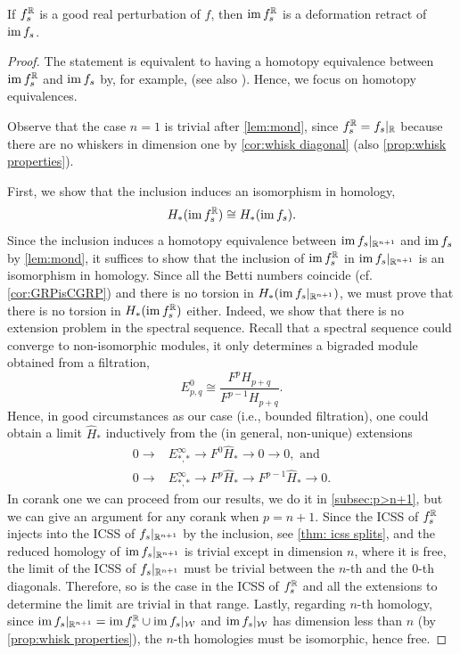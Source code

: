 \documentclass[a4paper,12pt]{amsart}
\begin{document}
\begin{theorem}\label{thm:htequin+1}
If $f_s^{\mathbb{R}}$ is a good real perturbation of $f$, then $\operatorname{im} f_s^{\mathbb{R}}$ is a deformation retract of $\operatorname{im} f_s$.
\end{theorem}
\begin{proof}
The statement is equivalent to having a homotopy equivalence between $\operatorname{im} f_s^{\mathbb{R}}$ and $\operatorname{im} f_s$ by, for example, \cite[Corollary 0.20]{Hatcher2002} (see also \cite[Proposition 0.16]{Hatcher2002}). Hence, we focus on homotopy equivalences.
\newline

Observe that the case $n=1$ is trivial after \cref{lem:mond}, since $f_s^{\mathbb{R}}=f_s|_{\mathbb{R}}$ because there are no whiskers in dimension one by \cref{cor:whisk diagonal} (also \cref{prop:whisk properties}).

First, we show that the inclusion induces an isomorphism in homology,
\[H_*(\operatorname{im} f_s^{\mathbb{R}})\cong H_*( \operatorname{im} f_s).\]
Since the inclusion induces a homotopy equivalence between $\operatorname{im} f_s|_{\mathbb{R}^{n+1}}$ and $\operatorname{im} f_s$ by \cref{lem:mond}, it suffices to show that the inclusion of $\operatorname{im} f_s^{\mathbb{R}}$ in $\operatorname{im} f_s|_{\mathbb{R}^{n+1}}$ is an isomorphism in homology. Since all the Betti numbers coincide (cf. \cref{cor:GRPisCGRP}) and there is no torsion in $H_*(\operatorname{im} f_s|_{\mathbb{R}^{n+1}})$, we must prove that there is no torsion in $H_*(\operatorname{im} f_s^{\mathbb{R}})$ either. Indeed, we show that there is no extension problem in the spectral sequence. Recall that a spectral sequence could converge to non-isomorphic modules, it only determines a bigraded module obtained from a filtration,
\[ E^0_{p,q}\cong\frac{F^{p} H_{p+q}}{F^{p-1} H_{p+q}}.  \]
Hence, in good circumstances as our case (i.e., bounded filtration), one could obtain a limit $\hat{H}_*$ inductively from the (in general, non-unique) extensions
\[\begin{aligned}
0\to& E^{\infty}_{*,*}\to F^{0} \hat{H}_*\to 0\to 0, \text{ and}\\
0\to& E^\infty_{*,*} \to F^{p} \hat{H}_* \to F^{p-1} \hat{H}_* \to 0.
\end{aligned}\]
In corank one we can proceed from our results, we do it in \cref{subsec:p>n+1}, but we can give an argument for any corank when $p=n+1$. Since the ICSS of $f_s^{\mathbb{R}}$ injects into the ICSS of $f_s|_{\mathbb{R}^{n+1}}$ by the inclusion, see \cref{thm: icss splits}, and the reduced homology of $\operatorname{im} f_s|_{\mathbb{R}^{n+1}}$ is trivial except in dimension $n$, where it is free, the limit of the ICSS of $f_s|_{\mathbb{R}^{n+1}}$ must be trivial between the $n$-th and the $0$-th diagonals. Therefore, so is the case in the ICSS of $f_s^{\mathbb{R}}$ and all the extensions to determine the limit are trivial in that range. Lastly, regarding $n$-th homology, since $\operatorname{im} f_s|_{\mathbb{R}^{n+1}}=\operatorname{im} f_s^{\mathbb{R}} \cup \operatorname{im} f_s|_{\mathcal{W}}$ and $\operatorname{im} f_s|_{\mathcal{W}}$ has dimension less than $n$ (by \cref{prop:whisk properties}), the $n$-th homologies must be isomorphic, hence free.


\end{proof}
\end{document}
